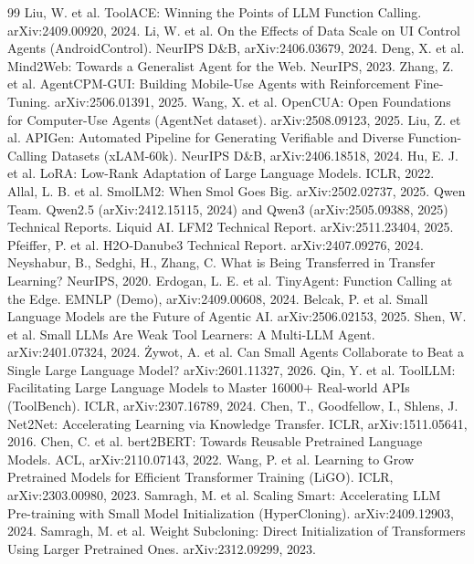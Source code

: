 \documentclass{article}
\begin{document}
\clearpage
\begin{thebibliography}{99}
\footnotesize
{} Liu, W. et al. ToolACE: Winning the Points of LLM Function Calling. arXiv:2409.00920, 2024.
 Li, W. et al. On the Effects of Data Scale on UI Control Agents (AndroidControl). NeurIPS D\&B, arXiv:2406.03679, 2024.
 Deng, X. et al. Mind2Web: Towards a Generalist Agent for the Web. NeurIPS, 2023.
 Zhang, Z. et al. AgentCPM-GUI: Building Mobile-Use Agents with Reinforcement Fine-Tuning. arXiv:2506.01391, 2025.
 Wang, X. et al. OpenCUA: Open Foundations for Computer-Use Agents (AgentNet dataset). arXiv:2508.09123, 2025.
 Liu, Z. et al. APIGen: Automated Pipeline for Generating Verifiable and Diverse Function-Calling Datasets (xLAM-60k). NeurIPS D\&B, arXiv:2406.18518, 2024.
 Hu, E. J. et al. LoRA: Low-Rank Adaptation of Large Language Models. ICLR, 2022.
 Allal, L. B. et al. SmolLM2: When Smol Goes Big. arXiv:2502.02737, 2025.
 Qwen Team. Qwen2.5 (arXiv:2412.15115, 2024) and Qwen3 (arXiv:2505.09388, 2025) Technical Reports.
 Liquid AI. LFM2 Technical Report. arXiv:2511.23404, 2025.
 Pfeiffer, P. et al. H2O-Danube3 Technical Report. arXiv:2407.09276, 2024.
 Neyshabur, B., Sedghi, H., Zhang, C. What is Being Transferred in Transfer Learning? NeurIPS, 2020.
 Erdogan, L. E. et al. TinyAgent: Function Calling at the Edge. EMNLP (Demo), arXiv:2409.00608, 2024.
 Belcak, P. et al. Small Language Models are the Future of Agentic AI. arXiv:2506.02153, 2025.
 Shen, W. et al. Small LLMs Are Weak Tool Learners: A Multi-LLM Agent. arXiv:2401.07324, 2024.
 \.{Z}ywot, A. et al. Can Small Agents Collaborate to Beat a Single Large Language Model? arXiv:2601.11327, 2026.
 Qin, Y. et al. ToolLLM: Facilitating Large Language Models to Master 16000+ Real-world APIs (ToolBench). ICLR, arXiv:2307.16789, 2024.
 Chen, T., Goodfellow, I., Shlens, J. Net2Net: Accelerating Learning via Knowledge Transfer. ICLR, arXiv:1511.05641, 2016.
 Chen, C. et al. bert2BERT: Towards Reusable Pretrained Language Models. ACL, arXiv:2110.07143, 2022.
 Wang, P. et al. Learning to Grow Pretrained Models for Efficient Transformer Training (LiGO). ICLR, arXiv:2303.00980, 2023.
 Samragh, M. et al. Scaling Smart: Accelerating LLM Pre-training with Small Model Initialization (HyperCloning). arXiv:2409.12903, 2024.
 Samragh, M. et al. Weight Subcloning: Direct Initialization of Transformers Using Larger Pretrained Ones. arXiv:2312.09299, 2023.

\end{thebibliography}
\end{document}
